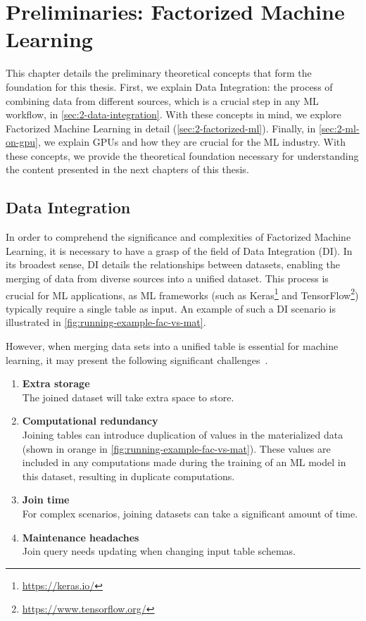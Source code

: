 
\chapter{Preliminaries: Factorized Machine Learning}
\label{chapter:preliminary}

This chapter details the preliminary theoretical concepts that form the foundation for this thesis. First, we explain Data Integration: the process of combining data from different sources, which is a crucial step in any ML workflow, in \autoref{sec:2-data-integration}. With these concepts in mind, we explore Factorized Machine Learning in detail (\autoref{sec:2-factorized-ml}). Finally, in \autoref{sec:2-ml-on-gpu}, we explain GPUs and how they are crucial for the ML industry. With these concepts, we provide the theoretical foundation necessary for understanding the content presented in the next chapters of this thesis.


\section{Data Integration}
\label{sec:2-data-integration}
In order to comprehend the significance and complexities of Factorized Machine Learning, it is necessary to have a grasp of the field of Data Integration (DI). In its broadest sense, DI details the relationships between datasets, enabling the merging of data from diverse sources into a unified dataset. This process is crucial for ML applications, as ML frameworks (such as Keras\footnote{\url{https://keras.io/}} and TensorFlow\footnote{\url{https://www.tensorflow.org/}}) typically require a single table as input. An example of such a DI scenario is illustrated in \autoref{fig:running-example-fac-vs-mat}.

However, when merging data sets into a unified table is essential for machine learning, it may present the following significant challenges~\cite{data-management-in-ML-kumar-2017}.

\begin{enumerate}
  \item \textbf{Extra storage}\\ The joined dataset will take extra space to store.
  \item \textbf{Computational redundancy} \\ Joining tables can introduce duplication of values in the materialized data (shown in orange in \autoref{fig:running-example-fac-vs-mat}). These values are included in any computations made during the training of an ML model in this dataset, resulting in duplicate computations.
  \item \textbf{Join time} \\For complex scenarios, joining datasets can take a significant amount of time.
  \item \textbf{Maintenance headaches} \\Join query needs updating when changing input table schemas.
\end{enumerate}

